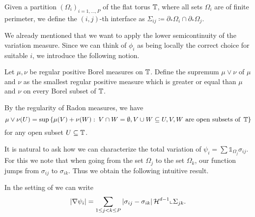\begin{definition}
	Given a partition $ \left( \Omega_{ i } \right)_{ i = 1 , \dotsc , P } $ of 
	the flat torus $ \operatorname{\mathbb{T}} $, where all sets $ \Omega_{ i } $ are of 
	finite perimeter, we define the $ (i,j)$-th interface as $ \Sigma_{ i j } 
	\coloneqq \partial_{ \ast } \Omega_{ i } \cap \partial_{ \ast } \Omega_{ j 
	} $.
\end{definition}

We already mentioned that we want to apply the lower semicontinuity of the variation measure. Since we can think of $ \phi_{ i } $ as being locally the correct choice for suitable $ i $, we introduce the following notion.

\begin{definition}
	Let $ \mu , \nu $ be regular positive Borel measures on $ \operatorname{\mathbb{T}} $. 
	Define the supremum $ \mu \vee \nu $ of $ \mu $ and $ \nu $ as the smallest 
	regular positive measure which is greater or equal than $ \mu $ and $ \nu $ 
	on every Borel subset of $ \operatorname{\mathbb{T}} $. 
\end{definition}

\begin{remark}
By the regularity of Radon 
	measures, we have
	\begin{equation*}
		\mu \vee \nu ( U ) 
		=
		\sup \left\{
			\mu ( V ) + \nu ( W )
			\, \colon \,
			V \cap W = \emptyset,
			V \cup W \subseteq U, 
			V,W \text{ are open subsets of } \operatorname{\mathbb{T}}
		\right\}
	\end{equation*}	for any open subset $ U \subseteq \operatorname{\mathbb{T}} $.
\end{remark}

It is natural to ask how we can characterize the total variation of $ \psi_{ i 
} = \sum \mathds{ 1 }_{ \Omega_{ j } } \sigma_{ i j } $. 
For this we note that when going from the set $ \Omega_{ j } $ to the set $ 
\Omega_{ k } $, 
our function jumps from $ \sigma_{ i j } $ to $ \sigma_{ i k } $. Thus we 
obtain the following intuitive result.

\begin{lemma}
	\label{rewriting_variation_of_psi_i}
	In the setting of  we can write
	\begin{equation*}
		\abs{ \nabla \psi_{ i } }
		=
		\sum_{ 1 \leq j < k \leq P }
			\abs{ \sigma_{ i j } - \sigma_{ i k } }
			\operatorname{\mathcal{H}}^{ d - 1 } \llcorner{ \Sigma_{ j k } } .
	\end{equation*}
\end{lemma}

